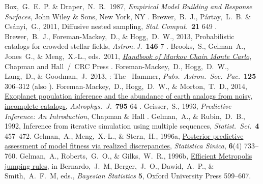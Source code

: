 \documentclass[modern]{aastex61}
\newcommand{\MCMC}{\acronym{MCMC}}
\begin{document}
\raggedright
\begin{thebibliography}{}
  Box,~G.~E.~P. \& Draper,~N.~R.\ 1987,
  \textit{Empirical Model Building and Response Surfaces},
  John Wiley \& Sons, New York, NY
  .
  Brewer,~B.~J., P\'artay,~L.~B. \& Cs\'anyi,~G., 2011,
  {Diffusive nested sampling},
  \textit{Stat.\,Comput.}\ \textbf{21} 649
  .
  Brewer,~B.~J., Foreman-Mackey,~D., \& Hogg,~D.~W., 2013,
  {Probabilistic catalogs for crowded stellar fields},
  \textit{Astron.\,J.}\ \textbf{146} 7
  .
  Brooks,~S., Gelman~A., Jones~G., \& Meng,~X.-L., eds.\ 2011,
  \href{http://www.mcmchandbook.net/HandbookTableofContents.html}{\textit{Handbook of Markov Chain Monte Carlo}},
  Chapman and Hall~/~CRC Press
  .
  Foreman-Mackey,~D., Hogg,~D.~W., Lang,~D., \& Goodman,~J.\ 2013,
  : The \MCMC\ Hammer,
  \textit{Pubs.\ Astron.\ Soc.\ Pac.}\ \textbf{125} 306--312
  (also ).
  Foreman-Mackey,~D., Hogg,~D.~W., \& Morton,~T.~D., 2014,
  \href{http://adsabs.harvard.edu/abs/2014ApJ...795...64F}{Exoplanet population
    inference and the abundance of earth analogs from noisy, incomplete catalogs},
  \textit{Astrophys.\ J.}\ \textbf{795} 64
  .
  Geisser,~S., 1993,
  \textit{Predictive Inference: An Introduction},
  Chapman \& Hall
  .
  Gelman,~A., \& Rubin,~D.~B., 1992,
  Inference from iterative simulation using multiple sequences,
  \textit{Statist.\ Sci.}\ \textbf{4} 457--472.
  Gelman,~A., Meng,~X.-L., \& Stern,~H., 1996a,
  \href{http://www.jstor.org/stable/24306036}{Posterior predictive assessment of model fitness via realized discrepancies},
  \textit{Statistica Sinica}, \textbf{6}(4) 733--760.
  Gelman,~A., Roberts,~G.~O., \& Gilks,~W.~R., 1996b,
  \href{http://www.stat.columbia.edu/~gelman/research/published/baystat5.pdf}{Efficient Metropolis jumping rules},
  in Bernardo,~J.~M, Berger,~J.~O., Dawid,~A.~P., \& Smith,~A.~F.~M, eds.,
  \textit{Bayesian Statistics} \textbf{5}, Oxford University Press
  599--607.

\end{thebibliography}
\end{document}
